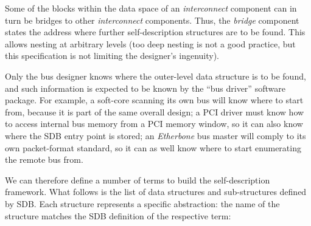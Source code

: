 \documentclass[a4paper, 12pt]{article}
\begin{document}
Some of the blocks within the data space of an \textit{interconnect}
component can in turn be
bridges to other \textit{interconnect} components.  Thus, the \textit{bridge}
component states the address where further self-description structures are to
be found. This allows nesting at arbitrary levels (too deep nesting is
not a good practice, but this specification is not limiting the
designer's ingenuity).

Only the bus designer knows where the outer-level data structure is to
be found, and such information is expected to be known by the ``bus
driver'' software package.  For example, a soft-core scanning its own
bus will know where to start from, because it is part of the same
overall design; a PCI driver must know how to access internal bus
memory from a PCI memory window, so it can also know where the
SDB entry point is stored; an \textit{Etherbone} bus master will
comply to its own packet-format standard, so it can as well know
where to start enumerating the remote bus from.

We can therefore define a number of terms to build the
self-description framework. What follows is the list of data
structures and sub-structures defined by SDB. Each
structure represents a specific abstraction: the name of the
structure matches the SDB definition of the respective term:
\end{document}
